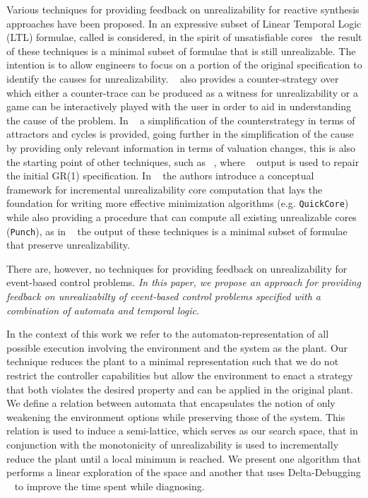 Various techniques for providing feedback on unrealizability for reactive synthesis 
approaches have been proposed. In \cite{DBLP:conf/fmcad/KonighoferHB09, 
DBLP:journals/scp/Schuppan12,DBLP:conf/fmcad/AlurMT13,maoz2021unrealizable}
an expressive subset of Linear Temporal 
Logic (LTL) formulae, called \gr is considered, in the spirit of unsatisfiable cores~\cite{Torlak:2008} the result of these techniques is a minimal subset of formulae that is still 
unrealizable. The intention is to allow engineers to focus on a portion of the original 
specification to identify the causes for unrealizability. 
~\cite{DBLP:conf/fmcad/KonighoferHB09} also provides a counter-strategy over which 
either a counter-trace can be produced as a witness for unrealizability or a game can be 
interactively played with the user in order to aid in understanding the cause of the 
problem. In ~\cite{DBLP:conf/sigsoft/KuventMR17} a simplification of the 
counterstrategy in terms of attractors and cycles is provided, going further in the 
simplification of the cause by providing only relevant information in terms of valuation 
changes, this is also the starting point of other techniques, such as 
~\cite{maoz2019symbolic}, where ~\cite{DBLP:conf/sigsoft/KuventMR17} output is 
used to repair the initial GR(1) specification. In ~\cite{maoz2021unrealizable} the authors introduce a conceptual framework for incremental unrealizability core computation that lays the foundation for writing more effective minimization algorithms (e.g. \texttt{QuickCore}) while also providing a procedure that can compute all existing unrealizable cores (\texttt{Punch}), as in ~\cite{Torlak:2008} the output of these techniques is a minimal subset of formulae that preserve
unrealizability.

There are, however, no techniques for providing feedback on unrealizability for 
event-based control problems. \emph{In this paper, we propose an approach for  
providing  feedback on unrealizabilty of event-based control problems specified with a combination of 
automata and temporal logic}.
%
%
%

In the context of this work we refer to the automaton-representation of all 
possible execution involving the environment and the system as the plant. Our 
technique reduces the plant to a minimal representation such that we do not restrict the 
controller capabilities but allow the 
environment to 
enact a strategy that both violates the desired property and can be applied in the 
original plant. We define a relation between automata that encapsulates the notion of 
only weakening the environment options while preserving those of the system. This 
relation is used to induce a semi-lattice, which serves as our search space, that in conjunction with the 
monotonicity of unrealizability is used to incrementally reduce the plant until a local 
minimum is reached. We present one algorithm that performs a linear exploration of the 
space and another that uses Delta-Debugging ~\cite{DBLP:journals/tse/ZellerH02} to 
 improve the time spent while diagnosing.


